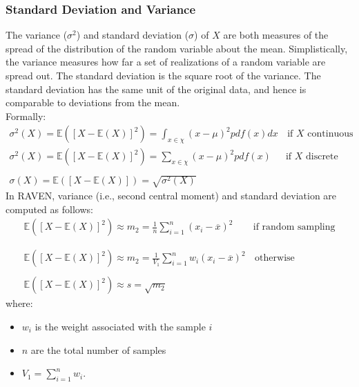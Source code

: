 \subsubsection{Standard Deviation and Variance}
The variance ($\sigma^{2}$) and standard deviation ($\sigma$) of $X$ are both measures of the spread of the distribution of the random variable about the 
mean. Simplistically, the variance measures how far a set of realizations of a random variable are spread out.
The standard deviation is the square root of the variance. The standard deviation has the same unit of the original data, and hence is comparable to deviations from the mean.
\\Formally:
\begin{equation}
  \begin{matrix}
  \sigma^{2}(X)= \mathbb{E}\left(\left[X - \mathbb{E}(X)\right]^{2}\right) = \int_{x \in \chi} (x - \mu)^2 pdf(x) dx  & \,\text{if $X$ continuous} \\
  \sigma^{2}(X)= \mathbb{E}\left(\left[X - \mathbb{E}(X)\right]^{2}\right)  = \sum_{x \in \chi} (x - \mu)^2 pdf(x)  & \text{if  $X$ discrete}
  \\
  \\ 
  \sigma(X)= \mathbb{E}\left(\left[X - \mathbb{E}(X)\right]\right)  = \sqrt{\sigma^{2}(X)}
  \end{matrix}
\end{equation}
In RAVEN, variance (i.e., second central moment) and standard deviation are computed as follows:
\begin{equation}
\begin{matrix}
\mathbb{E}\left(\left[X - \mathbb{E}(X)\right]^{2}\right)  \approx  m_{2} = \frac{1}{n} \sum_{i=1}^{n}  (x_{i} - \overline{x})^{2} & \text{if  random sampling} \\ 
\\ 
\\
\mathbb{E}\left(\left[X - \mathbb{E}(X)\right]^{2}\right)  \approx m_{2}  = \frac{1}{V_{1}} \sum_{i=1}^{n} w_{i}  (x_{i} - \overline{x})^{2}  & \, \text{otherwise}
\\
\\
\mathbb{E}\left(\left[X - \mathbb{E}(X)\right]^{2}\right)  \approx s  =  \sqrt{m_{2}}
\end{matrix}
\end{equation}
where:
\begin{itemize}
  \item $w_{i}$ is the weight associated with the sample $i$
  \item $n$ are the total number of samples
  \item $V_{1} = \sum_{i=1}^{n} w_{i}$.
\end{itemize}
